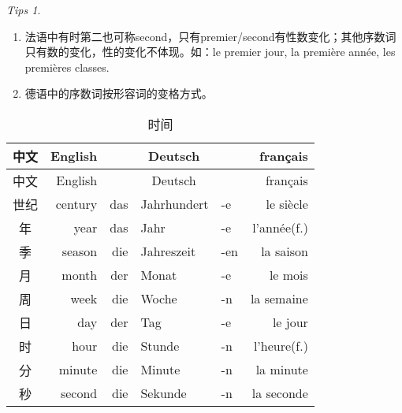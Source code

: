 \documentclass[12pt,A4paper,oneside,reqno]{amsart}
\numberwithin{equation}{section}
\theoremstyle{plain}
\theoremstyle{plain}
\theoremstyle{plain}
\numberwithin{equation}{section}
\theoremstyle{remark}
\newtheorem{tips}[theorem]{Tips}
\begin{document}
\begin{tips}\
	\begin{enumerate}[1.]
		\item 法语中有时第二也可称second，只有premier/second有性数变化；其他序数词只有数的变化，性的变化不体现。如：le premier jour, la premi\`{e}re ann\'{e}e, les premi\`{e}res classes.
		\item 德语中的序数词按形容词的变格方式。
	\end{enumerate}
	
\end{tips}

\begin{longtable}{c|r|rll|r}
	\hline
	中文	&	English	&	\multicolumn{3}{c|}{Deutsch}	&	français	\\
	\hline
	\endhead
	\hline
	中文	&	English	&	\multicolumn{3}{c|}{Deutsch}	&	français	\\
	\hline
	\endfirsthead	
	\hline
	\endfoot
	\hline	
	\caption{时间}
	\endlastfoot				
世纪	&	century	&	das	&	Jahrhundert	&	-e	&	le siècle	\\
年	&	year	&	das	&	Jahr	&	-e	&	l'ann\'{e}e(f.)	\\
季	&	season	&	die	&	Jahreszeit	&	-en	&	la saison	\\
月	&	month	&	der	&	Monat	&	-e	&	le mois 	\\
周	&	week	&	die	&	Woche	&	-n	&	la semaine	\\
日	&	day	&	der	&	Tag	&	-e	&	le jour	\\
时	&	hour	&	die	&	Stunde	&	-n	&	l'heure(f.)	\\
分	&	minute	&	die	&	Minute	&	-n	&	la minute	\\
秒	&	second	&	die	&	Sekunde	&	-n	&	la seconde 	\\


	
\end{longtable}
\end{document}
